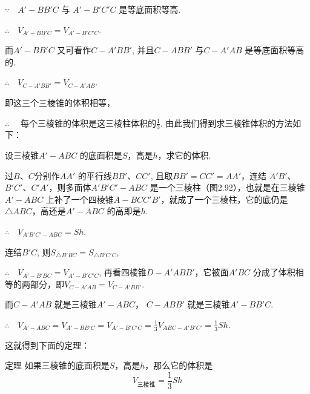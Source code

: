 \noindent
\begin{minipage}{.65\textwidth}\CTEXindent
$\because \quad A'-BB'C$ 与 $A'-B'C'C$ 是等底面积等高.

$\therefore\quad V_{A'-BB'C}=V_{A'-B'C'C}$.

而$A'-BB'C$ 又可看作$C-A'BB'$, 并且$C-ABB'$ 与$C-A'AB$ 是等底面积等高的.

$\therefore\quad V_{C-A'BB'}=V_{C-A'AB}$.

即这三个三棱锥的体积相等， 

$\therefore\quad$ 每个三棱锥的体积是这三棱柱体积的$\frac{1}{3}$. 由此我们得到求三棱锥体积的方法如下：
\end{minipage}\hfill
\begin{minipage}{.3\textwidth}
        \centering
{}
\end{minipage}

设三棱锥$A'-ABC$ 的底面积是$S$，高是$h$，求它的体积.

\begin{solution}
过$B$、$C$分别作$AA'$ 的平行线$BB'$、$CC'$, 且取$BB'=  CC'=AA'$，连结 $A'B'$、$B'C'$、$C'A'$，则多面体$A'B'C'-ABC$ 是一个三棱柱（图2.92），也就是在三棱锥$A'-ABC$ 上补了一个四棱锥$A-BCC'B'$，就成了一个三棱柱，它的底仍是$\triangle ABC$，高还是$A'-ABC$ 的高即是$h$.

$\therefore\quad V_{A'B'C'-ABC}=Sh$.

连结$B'C$, 则$S_{\triangle B'BC}=S_{\triangle B'C'C}$,

$\therefore\quad V_{A'-B'BC}=V_{A'-B'C'C}$, 再看四棱锥$D-A'ABB'$，它被面$A'BC$ 分成了体积相等的两部分，即$V_{C-A'AB}=V_{C-A'BB'}$.

而$C-A'AB$ 就是三棱锥$A'-ABC$，
$C-ABB'$ 就是三棱锥$A'-BB'C$.

$\therefore\quad V_{A'-ABC}=V_{A'-BB'C}=V_{A'-B'C'C}=\frac{1}{3}V_{ABC-A'B'C'}=\frac{1}{3}Sh$.
\end{solution}

这就得到下面的定理：

\begin{thm}
    {定理} 如果三棱锥的底面积是$S$，高是$h$，那么它的体积是
    \[V_{\text{三棱锥}}=\frac{1}{3}Sh\]
\end{thm}


